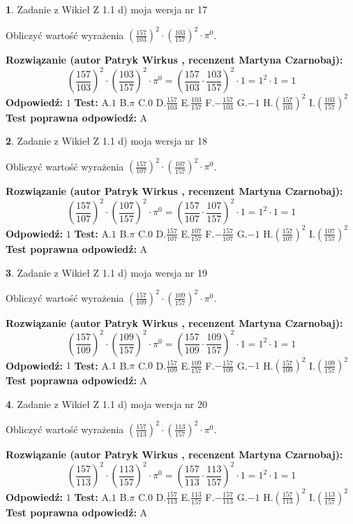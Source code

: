 \documentclass[12pt, a4paper]{article}
\theoremstyle{definition} %
\newtheorem{zad}{}
\newcommand{\zadStart}[1]{\begin{zad}#1\newline}
\newcommand{\zadStop}{\end{zad}}
\newcommand{\rozwStart}[2]{\noindent \textbf{Rozwiązanie (autor #1 , recenzent #2): }\newline}
\newcommand{\rozwStop}{\newline}
\newcommand{\odpStart}{\noindent \textbf{Odpowiedź:}\newline}
\newcommand{\odpStop}{\newline}
\newcommand{\testStart}{\noindent \textbf{Test:}\newline}
\newcommand{\testStop}{\newline}
\newcommand{\kluczStart}{\noindent \textbf{Test poprawna odpowiedź:}\newline}
\newcommand{\kluczStop}{\newline}
\begin{document}
\zadStart{Zadanie z Wikieł Z 1.1 d) moja wersja nr 17}

Obliczyć wartość wyrażenia $(\frac{157}{103})^{2} \cdot (\frac{103}{157})^{2} \cdot \pi^{0}$.
\zadStop
\rozwStart{Patryk Wirkus}{Martyna Czarnobaj}
$$(\frac{157}{103})^{2} \cdot (\frac{103}{157})^{2} \cdot \pi^{0} = (\frac{157}{103} \cdot \frac{103}{157})^{2} \cdot 1 = 1^{2} \cdot 1 = 1$$
\rozwStop
\odpStart
$1$
\odpStop
\testStart
A.$1$ B.$\pi$ C.$0$ D.$\frac{157}{103}$ E.$\frac{103}{157}$
F.$-\frac{157}{103}$ G.$-1$
H.$(\frac{157}{103})^{2}$
I.$(\frac{103}{157})^{2}$
\testStop
\kluczStart
A
\kluczStop



\zadStart{Zadanie z Wikieł Z 1.1 d) moja wersja nr 18}

Obliczyć wartość wyrażenia $(\frac{157}{107})^{2} \cdot (\frac{107}{157})^{2} \cdot \pi^{0}$.
\zadStop
\rozwStart{Patryk Wirkus}{Martyna Czarnobaj}
$$(\frac{157}{107})^{2} \cdot (\frac{107}{157})^{2} \cdot \pi^{0} = (\frac{157}{107} \cdot \frac{107}{157})^{2} \cdot 1 = 1^{2} \cdot 1 = 1$$
\rozwStop
\odpStart
$1$
\odpStop
\testStart
A.$1$ B.$\pi$ C.$0$ D.$\frac{157}{107}$ E.$\frac{107}{157}$
F.$-\frac{157}{107}$ G.$-1$
H.$(\frac{157}{107})^{2}$
I.$(\frac{107}{157})^{2}$
\testStop
\kluczStart
A
\kluczStop



\zadStart{Zadanie z Wikieł Z 1.1 d) moja wersja nr 19}

Obliczyć wartość wyrażenia $(\frac{157}{109})^{2} \cdot (\frac{109}{157})^{2} \cdot \pi^{0}$.
\zadStop
\rozwStart{Patryk Wirkus}{Martyna Czarnobaj}
$$(\frac{157}{109})^{2} \cdot (\frac{109}{157})^{2} \cdot \pi^{0} = (\frac{157}{109} \cdot \frac{109}{157})^{2} \cdot 1 = 1^{2} \cdot 1 = 1$$
\rozwStop
\odpStart
$1$
\odpStop
\testStart
A.$1$ B.$\pi$ C.$0$ D.$\frac{157}{109}$ E.$\frac{109}{157}$
F.$-\frac{157}{109}$ G.$-1$
H.$(\frac{157}{109})^{2}$
I.$(\frac{109}{157})^{2}$
\testStop
\kluczStart
A
\kluczStop



\zadStart{Zadanie z Wikieł Z 1.1 d) moja wersja nr 20}

Obliczyć wartość wyrażenia $(\frac{157}{113})^{2} \cdot (\frac{113}{157})^{2} \cdot \pi^{0}$.
\zadStop
\rozwStart{Patryk Wirkus}{Martyna Czarnobaj}
$$(\frac{157}{113})^{2} \cdot (\frac{113}{157})^{2} \cdot \pi^{0} = (\frac{157}{113} \cdot \frac{113}{157})^{2} \cdot 1 = 1^{2} \cdot 1 = 1$$
\rozwStop
\odpStart
$1$
\odpStop
\testStart
A.$1$ B.$\pi$ C.$0$ D.$\frac{157}{113}$ E.$\frac{113}{157}$
F.$-\frac{157}{113}$ G.$-1$
H.$(\frac{157}{113})^{2}$
I.$(\frac{113}{157})^{2}$
\testStop
\kluczStart
A
\kluczStop
\end{document}
